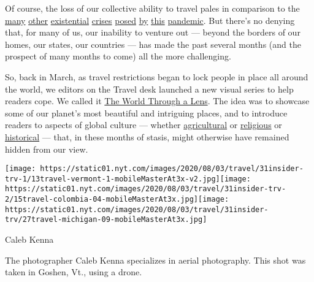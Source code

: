 Of course, the loss of our collective ability to travel pales in
comparison to the
\href{https://www.nytimes.com/interactive/2020/05/24/us/us-coronavirus-deaths-100000.html}{many}
\href{https://www.nytimes.com/interactive/2020/03/27/world/europe/coronavirus-italy-bergamo.html}{other}
\href{https://www.nytimes.com/2020/04/22/world/africa/coronavirus-hunger-crisis.html}{existential}
\href{https://www.nytimes.com/interactive/2020/world/coronavirus-health-care-workers.html}{crises}
\href{https://www.nytimes.com/2020/05/04/nyregion/coronavirus-nyc-burials-muslim.html}{posed}
\href{https://www.nytimes.com/2020/07/01/nyregion/Coronavirus-hospitals.html}{by}
\href{https://www.nytimes.com/2020/06/22/nyregion/nyc-evictions-moratorium-coronavirus.html}{this}
\href{https://www.nytimes.com/2020/07/23/business/economy/unemployment-economy-coronavirus.html}{pandemic}.
But there's no denying that, for many of us, our inability to venture
out --- beyond the borders of our homes, our states, our countries ---
has made the past several months (and the prospect of many months to
come) all the more challenging.

So, back in March, as travel restrictions began to lock people in place
all around the world, we editors on the Travel desk launched a new
visual series to help readers cope. We called it
\href{https://www.nytimes.com/column/the-world-through-a-lens}{The World
Through a Lens}. The idea was to showcase some of our planet's most
beautiful and intriguing places, and to introduce readers to aspects of
global culture --- whether
\href{https://www.nytimes.com/2020/05/12/travel/italy-saffron.html}{agricultural}
or
\href{https://www.nytimes.com/2020/04/22/travel/a-glimpse-inside-the-secluded-world-of-a-georgian-convent.html}{religious}
or
\href{https://www.nytimes.com/2020/04/15/travel/colombia-lost-city-ciudad-perdida.html}{historical}
--- that, in these months of stasis, might otherwise have remained
hidden from our view.

\texttt{[image: https://static01.nyt.com/images/2020/08/03/travel/31insider-trv-1/13travel-vermont-1-mobileMasterAt3x-v2.jpg]}\texttt{[image: https://static01.nyt.com/images/2020/08/03/travel/31insider-trv-2/15travel-colombia-04-mobileMasterAt3x.jpg]}\texttt{[image: https://static01.nyt.com/images/2020/08/03/travel/31insider-trv/27travel-michigan-09-mobileMasterAt3x.jpg]}

Caleb Kenna

The photographer Caleb Kenna specializes in aerial photography. This
shot was taken in Goshen, Vt., using a drone.

